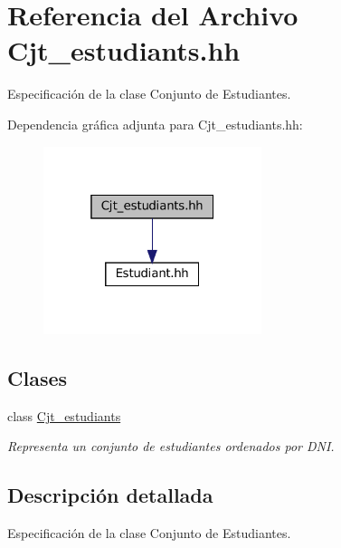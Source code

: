 \hypertarget{_cjt__estudiants_8hh}{}\section{Referencia del Archivo Cjt\+\_\+estudiants.\+hh}
\label{_cjt__estudiants_8hh}


Especificación de la clase Conjunto de Estudiantes.  


Dependencia gráfica adjunta para Cjt\+\_\+estudiants.\+hh\+:\nopagebreak
\begin{figure}[H]
\begin{center}
\leavevmode
\includegraphics[width=181pt]{_cjt__estudiants_8hh__incl}
\end{center}
\end{figure}
\subsection*{Clases}
\begin{DoxyCompactItemize}
\item 
class \hyperlink{class_cjt__estudiants}{Cjt\+\_\+estudiants}
\begin{DoxyCompactList}\small\item\em Representa un conjunto de estudiantes ordenados por D\+NI. \end{DoxyCompactList}\end{DoxyCompactItemize}


\subsection{Descripción detallada}
Especificación de la clase Conjunto de Estudiantes. 


